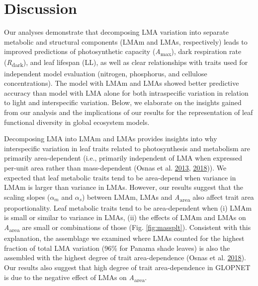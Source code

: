 \documentclass[
  12pt,
]{article}
\begin{document}
\hypertarget{discussion}{%
\section{Discussion}\label{discussion}}

Our analyses demonstrate that decomposing LMA variation into separate metabolic and structural components (LMAm and LMAs, respectively) leads to improved predictions of photosynthetic capacity (\emph{A}\textsubscript{max}), dark respiration rate (\emph{R}\textsubscript{dark}), and leaf lifespan (LL), as well as clear relationships with traits used for independent model evaluation (nitrogen, phosphorus, and cellulose concentrations).
The model with LMAm and LMAs showed better predictive accuracy than model with LMA alone for both intraspecific variation in relation to light and interspecific variation.
Below, we elaborate on the insights gained from our analysis and the implications of our results for the representation of leaf functional diversity in global ecosystem models.

Decomposing LMA into LMAm and LMAs provides insights into why interspecific variation in leaf traits related to photosynthesis and metabolism are primarily area-dependent (i.e., primarily independent of LMA when expressed per-unit area rather than mass-dependent (Osnas et al. \protect\hyperlink{ref-Osnas2013}{2013}, \protect\hyperlink{ref-Osnas2018}{2018})).
We expected that leaf metabolic traits tend to be area-depend when variance in LMAm is larger than variance in LMAs.
However, our results suggest that the scaling slopes (\(\alpha_m\) and \(\alpha_s\)) between LMAm, LMAs and \emph{A}\textsubscript{area} also affect trait area proportionality.
Leaf metabolic traits tend to be area-dependent when (i) LMAm is small or similar to variance in LMAs, (ii) the effects of LMAm and LMAs on \emph{A}\textsubscript{area} are small or combinations of those (Fig. \ref{fig:massplt}).
Consistent with this explanation, the assemblage we examined where LMAs counted for the highest fraction of total LMA variation (96\% for Panama shade leaves) is also the assembled with the highest degree of trait area-dependence (Osnas et al. \protect\hyperlink{ref-Osnas2018}{2018}).
Our results also suggest that high degree of trait area-dependence in GLOPNET is due to the negative effect of LMAs on \emph{A}\textsubscript{area}.
\end{document}
